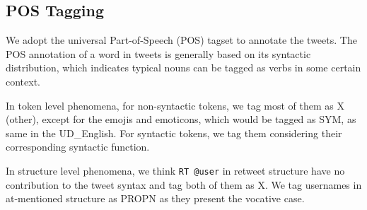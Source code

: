 \documentclass[11pt,letterpaper]{article}
\newcommand{\heart}{\ensuremath\heartsuit}
\begin{document}
%


\subsection{POS Tagging}
We adopt the universal Part-of-Speech (POS) tagset \cite{PETROV12.274} to annotate the tweets.
The POS annotation of a word in tweets is generally based on its syntactic distribution, which indicates typical nouns can be tagged as verbs in some certain context.

In token level phenomena, for non-syntactic tokens, we tag most of them as X (other), except for the emojis and emoticons, which would be tagged as SYM, as same in the UD\_English. 
For syntactic tokens, we tag them considering their corresponding syntactic function.

In structure level phenomena, we think {\tt RT @user} in retweet structure have no contribution to the tweet syntax and tag both of them as X.
We tag usernames in at-mentioned structure as PROPN as they present the vocative case.
\end{document}
